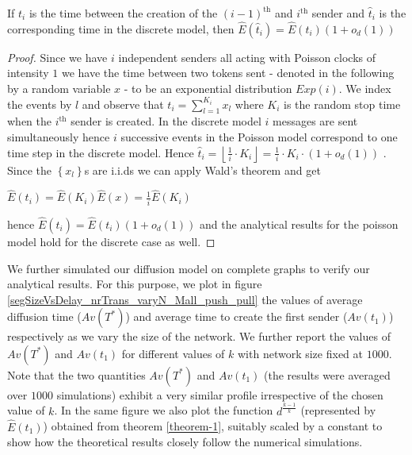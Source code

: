 \begin{theorem}
 If $t_{i}$ is the time between the creation of the $(i-1)^\textrm{th}$ and $i^\textrm{th}$ sender and 
 $\hat{t}_{i}$ is the corresponding time in the discrete model, then $\hat E \left( \hat{t}_{i}\right) =\hat E \left( t_{i}\right)
\left( 1+o_{d}\left( 1\right) \right) $ 
\end{theorem}
\begin{proof}
Since we have $i$ independent senders all acting with Poisson clocks of
intensity $1$ we have the time between two tokens sent - denoted in the
following by a random variable $x$ - to be an exponential distribution $%
Exp\left( i\right).$ We index the events by $l$ and observe that $t_{i}=%
\sum\limits_{l=1}^{K_{i}}x_{l}$ where $K_{i}$ is the
random stop time when the $i^\textrm{th}$ sender is created. In the discrete model $i$
messages are sent simultaneously 
hence $i$ successive events in the Poisson
model correspond to one time step in the discrete model. Hence $\hat{t}%
_{i}=\left\lfloor \frac{1}{i}\cdot K_{i}\right\rfloor =\frac{1}{i}\cdot
K_{i}\cdot \left( 1+o_{d}\left( 1\right) \right) $ . Since the $\left\{
x_{l}\right\} $s are i.i.ds we can apply Wald's theorem \cite{wald} and get 
\begin{center}
$\hat{E}\left( t_{i}\right) =\hat{E}\left( K_{i}\right) \hat{E}%
\left( x\right) =\frac{1}{i}\hat{E}\left( K_{i}\right)$ 
\end{center}%
hence $\hat{E}\left( \hat{t}_{i}\right) =\hat{E}\left( t_{i}\right)
\left( 1+o_{d}\left( 1\right) \right) $ and the analytical results for the poisson model hold for the discrete case as well.
\end{proof}

We further simulated our diffusion model on complete graphs to verify our analytical results. 
For this
purpose, we plot in figure \ref{segSizeVsDelay_nrTrans_varyN_Mall_push_pull}
the values of {average diffusion time ($Av(T^{\ast })$)} and {average time to create the first sender ($Av(t_{1})$)} respectively as we vary the size of the network. We further 
report the values of $Av(T^{\ast })$ and $Av(t_{1})$ for different values of $k$
with network size fixed at $1000$. 
Note that
the two quantities $Av(T^{\ast })$ and $Av(t_{1})$ (the results were averaged over $1000$ simulations) exhibit a
very similar profile irrespective of the chosen value of $k$. 
In the same
figure we also plot the function 
 $d^{\frac{k-1}{k}}$ (represented by $\hat E(t_1)$) { obtained from theorem \ref{theorem-1}}, suitably scaled by a
constant to show how the theoretical results closely follow  the
numerical simulations.

